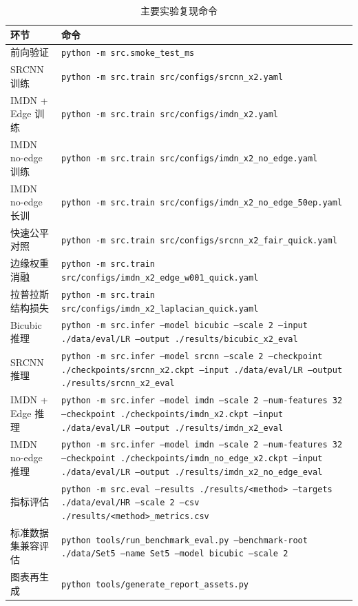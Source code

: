\documentclass[bwprint]{report}
\begin{document}
\begin{table}[H]
    \centering
    \caption{主要实验复现命令}
    \label{tab:reproduce-commands}
    \small
    \begin{tabular}{>{\raggedright\arraybackslash}p{2.9cm}>{\raggedright\arraybackslash}p{9.2cm}}
        \toprule
        环节 & 命令 \\
        \midrule
        前向验证 & \texttt{python -m src.smoke\_test\_ms} \\
        SRCNN 训练 & \texttt{python -m src.train src/configs/srcnn\_x2.yaml} \\
        IMDN + Edge 训练 & \texttt{python -m src.train src/configs/imdn\_x2.yaml} \\
        IMDN no-edge 训练 & \texttt{python -m src.train src/configs/imdn\_x2\_no\_edge.yaml} \\
        IMDN no-edge 长训 & \texttt{python -m src.train src/configs/imdn\_x2\_no\_edge\_50ep.yaml} \\
        快速公平对照 & \texttt{python -m src.train src/configs/srcnn\_x2\_fair\_quick.yaml} \\
        边缘权重消融 & \texttt{python -m src.train src/configs/imdn\_x2\_edge\_w001\_quick.yaml} \\
        拉普拉斯结构损失 & \texttt{python -m src.train src/configs/imdn\_x2\_laplacian\_quick.yaml} \\
        Bicubic 推理 & \texttt{python -m src.infer --model bicubic --scale 2 --input ./data/eval/LR --output ./results/bicubic\_x2\_eval} \\
        SRCNN 推理 & \texttt{python -m src.infer --model srcnn --scale 2 --checkpoint ./checkpoints/srcnn\_x2.ckpt --input ./data/eval/LR --output ./results/srcnn\_x2\_eval} \\
        IMDN + Edge 推理 & \texttt{python -m src.infer --model imdn --scale 2 --num-features 32 --checkpoint ./checkpoints/imdn\_x2.ckpt --input ./data/eval/LR --output ./results/imdn\_x2\_eval} \\
        IMDN no-edge 推理 & \texttt{python -m src.infer --model imdn --scale 2 --num-features 32 --checkpoint ./checkpoints/imdn\_no\_edge\_x2.ckpt --input ./data/eval/LR --output ./results/imdn\_x2\_no\_edge\_eval} \\
        指标评估 & \texttt{python -m src.eval --results ./results/<method> --targets ./data/eval/HR --scale 2 --csv ./results/<method>\_metrics.csv} \\
        标准数据集兼容评估 & \texttt{python tools/run\_benchmark\_eval.py --benchmark-root ./data/Set5 --name Set5 --model bicubic --scale 2} \\
        图表再生成 & \texttt{python tools/generate\_report\_assets.py} \\
        \bottomrule
    \end{tabular}
\end{table}
\end{document}
